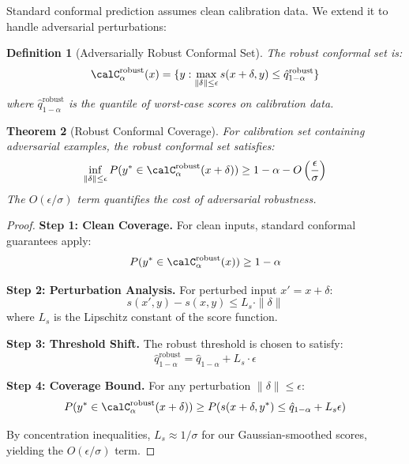 \documentclass[11pt,a4paper]{article}
\newtheorem{theorem}{Theorem}[section]
\newtheorem{definition}[theorem]{Definition}
\begin{document}
Standard conformal prediction assumes clean calibration data. We extend it to handle adversarial perturbations:

\begin{definition}[Adversarially Robust Conformal Set]
The robust conformal set is:
\begin{equation}
    \calC_\alpha^{\text{robust}}(x) = \{y : \max_{\|\delta\| \leq \epsilon} s(x + \delta, y) \leq \hat{q}_{1-\alpha}^{\text{robust}}\}
\end{equation}
where $\hat{q}_{1-\alpha}^{\text{robust}}$ is the quantile of worst-case scores on calibration data.
\end{definition}

\begin{theorem}[Robust Conformal Coverage]
\label{thm:harp_robust_conformal}
For calibration set containing adversarial examples, the robust conformal set satisfies:
\begin{equation}
    \inf_{\|\delta\| \leq \epsilon} P(y^* \in \calC_\alpha^{\text{robust}}(x + \delta)) \geq 1 - \alpha - O\left(\frac{\epsilon}{\sigma}\right)
\end{equation}
The $O(\epsilon/\sigma)$ term quantifies the cost of adversarial robustness.
\end{theorem}

\begin{proof}
\textbf{Step 1: Clean Coverage.} For clean inputs, standard conformal guarantees apply:
\begin{equation}
    P(y^* \in \calC_\alpha^{\text{robust}}(x)) \geq 1 - \alpha
\end{equation}

\textbf{Step 2: Perturbation Analysis.} For perturbed input $x' = x + \delta$:
\begin{equation}
    s(x', y) - s(x, y) \leq L_s \cdot \|\delta\|
\end{equation}
where $L_s$ is the Lipschitz constant of the score function.

\textbf{Step 3: Threshold Shift.} The robust threshold is chosen to satisfy:
\begin{equation}
    \hat{q}_{1-\alpha}^{\text{robust}} = \hat{q}_{1-\alpha} + L_s \cdot \epsilon
\end{equation}

\textbf{Step 4: Coverage Bound.} For any perturbation $\|\delta\| \leq \epsilon$:
\begin{equation}
    P(y^* \in \calC_\alpha^{\text{robust}}(x+\delta)) \geq P(s(x+\delta, y^*) \leq \hat{q}_{1-\alpha} + L_s\epsilon)
\end{equation}

By concentration inequalities, $L_s \approx 1/\sigma$ for our Gaussian-smoothed scores, yielding the $O(\epsilon/\sigma)$ term.
\end{proof}
\end{document}
